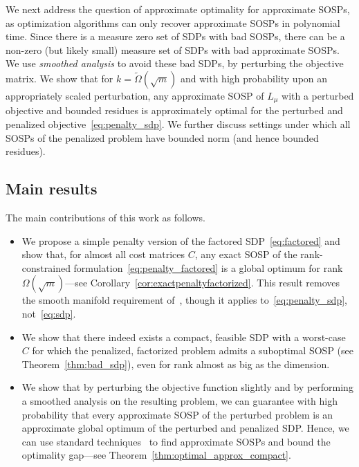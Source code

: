 We next address the question of approximate optimality for approximate SOSPs, as optimization algorithms can only recover approximate SOSPs in polynomial time. Since there is a measure zero set of SDPs with bad SOSPs, there can be a non-zero (but likely small) measure set of SDPs with bad approximate SOSPs. We use {\em smoothed analysis} to avoid these bad SDPs, by perturbing the objective matrix. We show that for $k=\tilde \Omega(\sqrt{m})$ and with high probability upon an appropriately scaled perturbation, any approximate SOSP of  $L_{\mu}$  with a perturbed objective and bounded residues is approximately optimal for the perturbed and penalized objective~\eqref{eq:penalty_sdp}. We further discuss settings under which all SOSPs of the penalized problem have bounded norm (and hence bounded residues).

\subsection{Main results}

The main contributions of this work as follows. 
\begin{itemize}
	\item We propose a simple penalty version of the factored SDP~\eqref{eq:factored} and show that, for almost all cost matrices $C$, any exact SOSP of the rank-constrained formulation~\eqref{eq:penalty_factored} is a global optimum for rank ${\Omega}(\sqrt{m})$---see Corollary~\ref{cor:exactpenaltyfactorized}. This result removes the smooth manifold requirement of~\citep{boumal2016non}, though it applies to~\eqref{eq:penalty_sdp}, not~\eqref{eq:sdp}.
	\item We show that there indeed exists a compact, feasible SDP with a worst-case $C$ for which the penalized, factorized problem admits a suboptimal SOSP (see Theorem~\ref{thm:bad_sdp}), even for rank almost as big as the dimension.
	\item We show that by perturbing the objective function slightly and by performing a smoothed analysis on the resulting problem, we can guarantee with high probability that every approximate SOSP of the perturbed problem is an approximate global optimum of the perturbed and penalized SDP. Hence, we can use standard techniques~\citep{cartis2012complexity,ge2015escaping} to find approximate SOSPs and bound the optimality gap---see Theorem~\ref{thm:optimal_approx_compact}.
\end{itemize}

